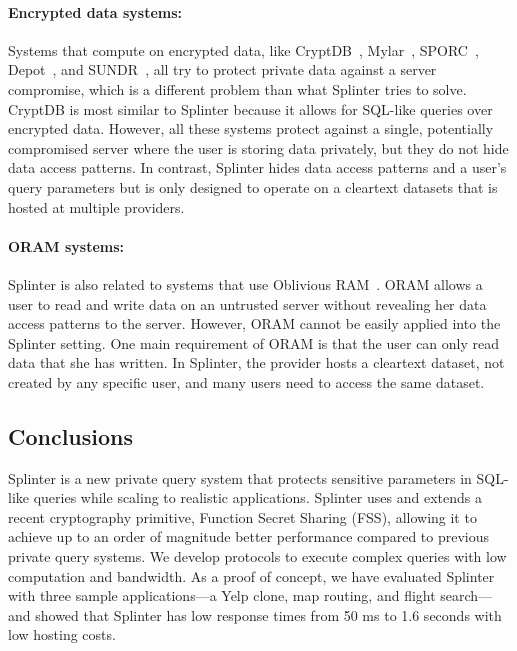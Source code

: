 \paragraph{Encrypted data systems:}
Systems that compute on encrypted data, like 
CryptDB~\cite{popa:cryptdb}, Mylar~\cite{popa:mylar}, SPORC~\cite{feldman:sporc},
Depot~\cite{mahajan:depot}, and SUNDR~\cite{li:sundr}, all try to protect
private data against a server compromise, which is a different
problem than what Splinter tries to solve. CryptDB is most similar to Splinter 
because it allows for SQL-like queries over encrypted data. However, all
these systems protect against a single, potentially compromised server 
where the user is storing data privately, but they do not hide data access patterns. 
In contrast, Splinter hides data access patterns and a user's query parameters 
but is only designed to operate on a cleartext 
datasets that is hosted at multiple providers.


\paragraph{ORAM systems:}
Splinter is also related to systems that use Oblivious RAM~\cite{stefanov:path-oram, lorch2013shroud}. 
ORAM allows a user to read and write data on an untrusted server without
revealing her data access patterns to the server. However, ORAM cannot be easily applied
into the Splinter setting. One main requirement of ORAM is that the user
can only read data that she has written. 
In Splinter, the provider hosts a cleartext dataset, not created by any specific user, 
and many users need to access the same dataset.

\subsection{Conclusions}
\label{spl-sec:conclusion}
Splinter is a new private query system that protects sensitive parameters
in SQL-like queries while scaling to realistic applications. Splinter uses and extends a recent
cryptography primitive, Function Secret Sharing (FSS),
allowing it to achieve up to an order of magnitude better
performance compared to previous private query systems. We develop
protocols to execute complex queries
with low computation and bandwidth. As a proof of concept,
we have evaluated Splinter with three sample applications---a Yelp clone,
map routing, and flight search---and showed
that Splinter has low response times from 50 ms to 1.6 seconds with low
hosting costs.
